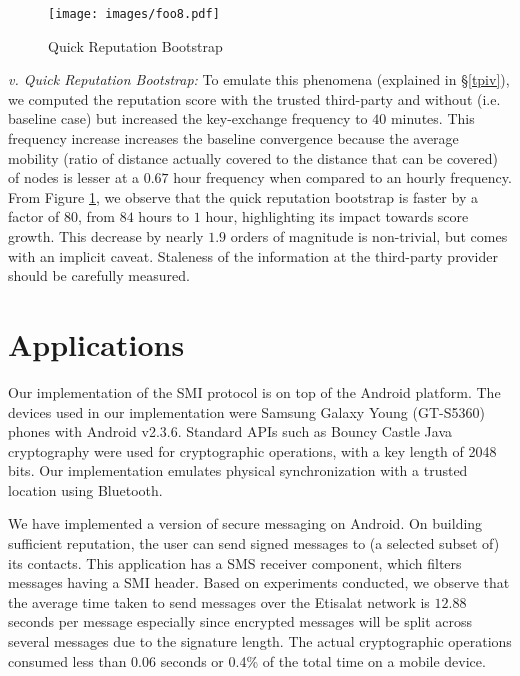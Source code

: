 \documentclass[letterpaper,twocolumn]{sig-alternate}
\begin{document}
\begin{figure}[h]
  \begin{center}
      \texttt{[image: images/foo8.pdf]}
    \end{center}
\vspace{-0.1in}
  \caption{\small{Quick Reputation Bootstrap}}
  \label{fig:qrb}
 \vspace{-0.1in}
\end{figure}


\vspace{1mm}
{\em v. Quick Reputation Bootstrap:} To emulate this phenomena (explained in \S \ref{tpiv}), we computed the reputation score with the trusted third-party and without (i.e. baseline case) but increased the key-exchange frequency to $40$ minutes. This frequency increase increases the baseline convergence because the average mobility (ratio of distance actually covered to the distance that can be covered) of nodes is lesser at a $0.67$ hour frequency when compared to an hourly frequency. From Figure \ref{fig:qrb}, we observe that the quick reputation bootstrap is faster by a factor of $80$, from $84$ hours to $1$ hour, highlighting its impact towards score growth. This decrease by nearly $1.9$ orders of magnitude is non-trivial, but comes with an implicit caveat. Staleness of the information at the third-party provider should be carefully measured.


 \section{Applications}
\label{impl}

Our implementation of the SMI protocol is on top of the Android platform. The devices used in our implementation were Samsung Galaxy Young (GT-S5360) phones with Android v2.3.6. Standard APIs such as Bouncy Castle Java cryptography were used for cryptographic operations, with a key length of 2048 bits. Our implementation emulates physical synchronization with a trusted location using Bluetooth. 

\vspace{1mm}
 We have implemented a version of secure messaging on Android. On building sufficient reputation, the user can send signed messages to (a selected subset of) its contacts. This application has a SMS receiver component, which filters messages having a SMI header. Based on experiments conducted, we observe that the average time taken to send messages over the Etisalat network is $12.88$ seconds per message especially since encrypted messages will be split across several messages due to the signature length. The actual cryptographic operations consumed less than $0.06$ seconds or 0.4\% of the total time on a mobile device.
\end{document}
